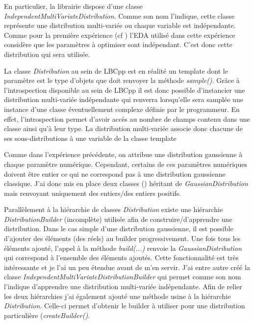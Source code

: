 \documentclass[a4paper, 11pt]{report}
\begin{document}
En particulier, la librairie dispose d'une classe \textit{IndependentMultiVariateDistribution}. Comme son nom l'indique, cette classe représente une distribution multi-variée ou chaque variable est indépendante. Comme pour la première expérience (cf )%
l'EDA utilisé dans cette expérience considère que les paramètres à optimiser sont indépendant. C'est donc cette distribution qui sera utilisée.

La classe \textit{Distribution} au sein de LBCpp est en réalité un template dont le paramètre est le type d'objets que doit renvoyer la méthode \textit{sample()}. Grâce à l'introspection disponible au sein de LBCpp il est donc possible d'instancier une distribution multi-variée indépendante qui renverra lorsqu'elle sera samplée %
une instance d'une classe éventuellement complexe définie par le programmeur. En effet, l'introspection permet d'avoir accès au nombre de champs contenu dans une classe ainsi qu'à leur type. La distribution multi-variée associe donc chacune de ses sous-distributions à une variable de la classe template %

Comme dans l'expérience précédente, on attribue une distribution gaussienne à chaque paramètre numérique. Cependant, certains de ces paramètres numériques doivent être entier ce qui ne correspond pas à une distribution gaussienne classique. J'ai donc mis en place deux classes ()%
héritant de \textit{GaussianDistribution} mais renvoyant uniquement des entiers/des entiers positifs.

Parallèlement à la hiérarchie de classes \textit{Distribution} existe une hiérarchie \textit{DistributionBuilder} (incomplète) utilisée afin de construire/d'apprendre une distribution. Dans le cas simple d'une distribution gaussienne, il est possible d'ajouter des éléments (des réels) au builder progressivement. Une fois tous les éléments ajouté, l'appel à la méthode \textit{build(...)} renvoie la \textit{GaussianDistribution} qui correspond à l'ensemble des éléments ajoutés. Cette fonctionnalité est très intéressante et je l'ai un peu étendue avant de m'en servir. J'ai entre autre créé la classe \textit{IndependentMultiVariateDistributionBuilder} qui permet comme son nom l'indique d'apprendre une distribution multi-variée indépendante. Afin de relier les deux hiérarchies j'ai également ajouté une méthode usine %
à la hiérarchie \textit{Distribution}. Celle-ci permet d'obtenir le builder à utiliser pour une distribution particulière (\textit{createBuilder()}.
\end{document}
